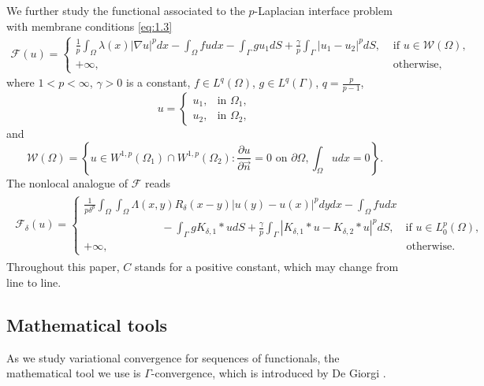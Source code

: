 \documentclass{article}
\theoremstyle{definition}
\begin{document}
We further study the functional associated to the $p$-Laplacian interface problem with membrane
conditions \eqref{eq:1.3}
\begin{align*}
\mathcal{F}(u)=
\begin{cases}
  \frac{1}{p}\int_{\Omega}\lambda(x)|\nabla u|^pdx
 -\int_\Omega fudx
 -\int_\Gamma gu_1dS
 +\frac{\gamma}{p}\int_\Gamma |u_1-u_2|^pdS, &\mbox{ if } u\in \mathcal{W}(\Omega),\\
  +\infty, &\mbox{ otherwise},
\end{cases}
\end{align*}
where $1<p<\infty$, $\gamma>0$ is a constant, $f\in L^q(\Omega)$, $g\in L^q(\Gamma)$, $q=\frac{p}{p-1}$,
\[
u=
\begin{cases}
u_1, & \text{in } \Omega_1, \\
u_2, & \text{in } \Omega_2,
\end{cases}
\]
and
\[
\mathcal{W}(\Omega)=\left\{u\in W^{1,p}(\Omega_1)\cap W^{1,p}(\Omega_2):
\frac{\partial u}{\partial\vec{n}}=0 \mbox{ on } \partial\Omega, \int_{\Omega} udx=0\right\}.
\]
The nonlocal analogue of $\mathcal{F}$ reads
\begin{align*}
\begin{split}
  \mathcal{F}_\delta(u)=
  \begin{cases}
     \frac{1}{p\delta^p}\int_{\Omega}\int_{\Omega}\Lambda(x,y)R_\delta(x-y)|u(y)-u(x)|^pdydx
-\int_{\Omega}fudx\\
\qquad\qquad\qquad\quad
-\int_\Gamma g K_{\delta,1}\ast u dS
+\frac{\gamma}{p}\int_\Gamma\left|K_{\delta,1}\ast u-K_{\delta,2}\ast u\right|^pdS,
\quad\mbox{if } u\in L^p_0(\Omega), \\
 +\infty,  \qquad\qquad\qquad\qquad\qquad\qquad\qquad\qquad\qquad\qquad\qquad
    \qquad\qquad\quad\mbox{otherwise}.
  \end{cases}
\end{split}
\end{align*}
Throughout this paper, $C$ stands for a positive constant, which may change from line to line.

\subsection{Mathematical tools}
As we study variational convergence for sequences of functionals, the mathematical tool we use is $\Gamma$-convergence,
which is introduced by De Giorgi \cite{dal2012introduction,braides2002gamma}.
\end{document}
